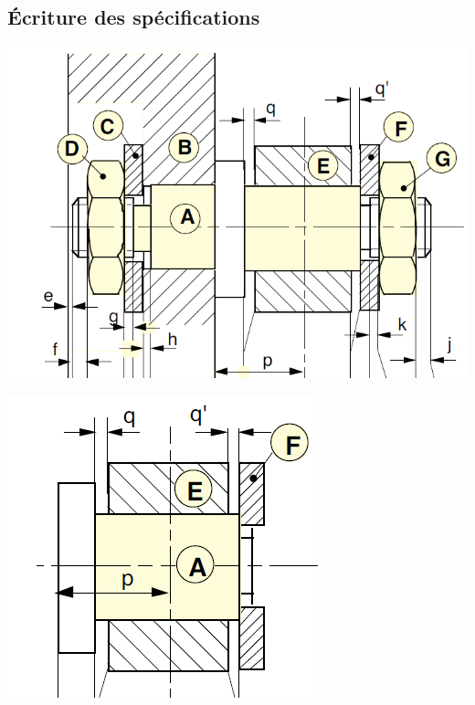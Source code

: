 \newpage

\subsection{Écriture des spécifications}

\begin{center}
 \includegraphics[width=0.7\linewidth]{img/Specif2}

\vspace{3cm}

 \includegraphics[width=0.4\linewidth]{img/Specif3.png}
\end{center}

\newpage

